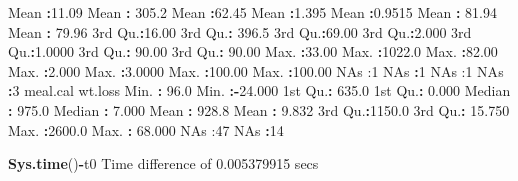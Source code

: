 \documentclass[
]{article}
\newenvironment{Shaded}{\begin{snugshade}}{\end{snugshade}}
\newcommand{\DecValTok}[1]{\textcolor[rgb]{0.00,0.00,0.81}{#1}}
\newcommand{\FloatTok}[1]{\textcolor[rgb]{0.00,0.00,0.81}{#1}}
\newcommand{\FunctionTok}[1]{\textcolor[rgb]{0.13,0.29,0.53}{\textbf{#1}}}
\newcommand{\NormalTok}[1]{#1}
\newcommand{\SpecialCharTok}[1]{\textcolor[rgb]{0.81,0.36,0.00}{\textbf{#1}}}
\newcommand{\StringTok}[1]{\textcolor[rgb]{0.31,0.60,0.02}{#1}}
\begin{document}
\begin{Shaded}
\begin{Highlighting}[]
\NormalTok{ Mean   }\SpecialCharTok{:}\FloatTok{11.09}\NormalTok{   Mean   }\SpecialCharTok{:} \FloatTok{305.2}\NormalTok{   Mean   }\SpecialCharTok{:}\FloatTok{62.45}\NormalTok{   Mean   }\SpecialCharTok{:}\FloatTok{1.395}\NormalTok{   Mean   }\SpecialCharTok{:}\FloatTok{0.9515}\NormalTok{   Mean   }\SpecialCharTok{:} \FloatTok{81.94}\NormalTok{   Mean   }\SpecialCharTok{:} \FloatTok{79.96}  
\NormalTok{ 3rd Qu.}\SpecialCharTok{:}\FloatTok{16.00}\NormalTok{   3rd Qu.}\SpecialCharTok{:} \FloatTok{396.5}\NormalTok{   3rd Qu.}\SpecialCharTok{:}\FloatTok{69.00}\NormalTok{   3rd Qu.}\SpecialCharTok{:}\FloatTok{2.000}\NormalTok{   3rd Qu.}\SpecialCharTok{:}\FloatTok{1.0000}\NormalTok{   3rd Qu.}\SpecialCharTok{:} \FloatTok{90.00}\NormalTok{   3rd Qu.}\SpecialCharTok{:} \FloatTok{90.00}  
\NormalTok{ Max.   }\SpecialCharTok{:}\FloatTok{33.00}\NormalTok{   Max.   }\SpecialCharTok{:}\FloatTok{1022.0}\NormalTok{   Max.   }\SpecialCharTok{:}\FloatTok{82.00}\NormalTok{   Max.   }\SpecialCharTok{:}\FloatTok{2.000}\NormalTok{   Max.   }\SpecialCharTok{:}\FloatTok{3.0000}\NormalTok{   Max.   }\SpecialCharTok{:}\FloatTok{100.00}\NormalTok{   Max.   }\SpecialCharTok{:}\FloatTok{100.00}  
\NormalTok{ NA}\StringTok{\textquotesingle{}s   :1                                                        NA\textquotesingle{}}\NormalTok{s   }\SpecialCharTok{:}\DecValTok{1}\NormalTok{        NA}\StringTok{\textquotesingle{}s   :1        NA\textquotesingle{}}\NormalTok{s   }\SpecialCharTok{:}\DecValTok{3}       
\NormalTok{    meal.cal         wt.loss       }
\NormalTok{ Min.   }\SpecialCharTok{:}  \FloatTok{96.0}\NormalTok{   Min.   }\SpecialCharTok{:{-}}\FloatTok{24.000}  
\NormalTok{ 1st Qu.}\SpecialCharTok{:} \FloatTok{635.0}\NormalTok{   1st Qu.}\SpecialCharTok{:}  \FloatTok{0.000}  
\NormalTok{ Median }\SpecialCharTok{:} \FloatTok{975.0}\NormalTok{   Median }\SpecialCharTok{:}  \FloatTok{7.000}  
\NormalTok{ Mean   }\SpecialCharTok{:} \FloatTok{928.8}\NormalTok{   Mean   }\SpecialCharTok{:}  \FloatTok{9.832}  
\NormalTok{ 3rd Qu.}\SpecialCharTok{:}\FloatTok{1150.0}\NormalTok{   3rd Qu.}\SpecialCharTok{:} \FloatTok{15.750}  
\NormalTok{ Max.   }\SpecialCharTok{:}\FloatTok{2600.0}\NormalTok{   Max.   }\SpecialCharTok{:} \FloatTok{68.000}  
\NormalTok{ NA}\StringTok{\textquotesingle{}s   :47       NA\textquotesingle{}}\NormalTok{s   }\SpecialCharTok{:}\DecValTok{14}       
\end{Highlighting}
\end{Shaded}

\begin{Shaded}
\begin{Highlighting}[]
\FunctionTok{Sys.time}\NormalTok{()}\SpecialCharTok{{-}}\NormalTok{t0}
\NormalTok{Time difference of }\FloatTok{0.005379915}\NormalTok{ secs}
\end{Highlighting}
\end{Shaded}
\end{document}
